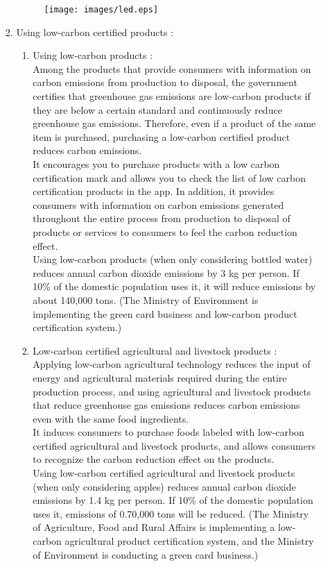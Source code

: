 \documentclass[11pt, conference]{IEEEtran}
\begin{document}
\begin{enumerate}[label=\arabic*]
\begin{enumerate}[label=\alph*]
\begin{enumerate}[label=\roman*]
            \begin{figure}[H]
                \centering
                \texttt{[image: images/led.eps]}
            \end{figure}
            \item Using low-carbon certified products :
                \begin{enumerate}[label= \romannum{5}.\roman*]
                \item Using low-carbon products : \\
                Among the products that provide consumers with information on carbon emissions from production to disposal, the government certifies that greenhouse gas emissions are low-carbon products if they are below a certain standard and continuously reduce greenhouse gas emissions. Therefore, even if a product of the same item is purchased, purchasing a low-carbon certified product reduces carbon emissions.\\
                It encourages you to purchase products with a low carbon certification mark and allows you to check the list of low carbon certification products in the app. In addition, it provides consumers with information on carbon emissions generated throughout the entire process from production to disposal of products or services to consumers to feel the carbon reduction effect.\\
                Using low-carbon products (when only considering bottled water) reduces annual carbon dioxide emissions by 3 kg per person. If 10\% of the domestic population uses it, it will reduce emissions by about 140,000 tons. (The Ministry of Environment is implementing the green card business and low-carbon product certification system.)
                \item Low-carbon certified agricultural and livestock products : \\
                Applying low-carbon agricultural technology reduces the input of energy and agricultural materials required during the entire production process, and using agricultural and livestock products that reduce greenhouse gas emissions reduces carbon emissions even with the same food ingredients.\\
                It induces consumers to purchase foods labeled with low-carbon certified agricultural and livestock products, and allows consumers to recognize the carbon reduction effect on the products.\\
                Using low-carbon certified agricultural and livestock products (when only considering apples) reduces annual carbon dioxide emissions by 1.4 kg per person. If 10\% of the domestic population uses it, emissions of 0.70,000 tons will be reduced. (The Ministry of Agriculture, Food and Rural Affairs is implementing a low-carbon agricultural product certification system, and the Ministry of Environment is conducting a green card business.)\\

\end{enumerate}
\end{enumerate}
\end{enumerate}
\end{enumerate}
\end{document}
